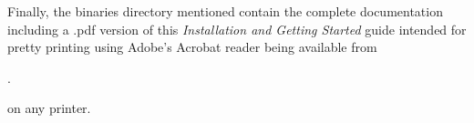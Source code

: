 Finally, the binaries directory mentioned contain the complete
\FlightGear documentation including a .pdf version of this
\textit{Installation and Getting Started} guide intended for
pretty printing using Adobe's Acrobat reader being available from



.

\noindent
 on any printer.

